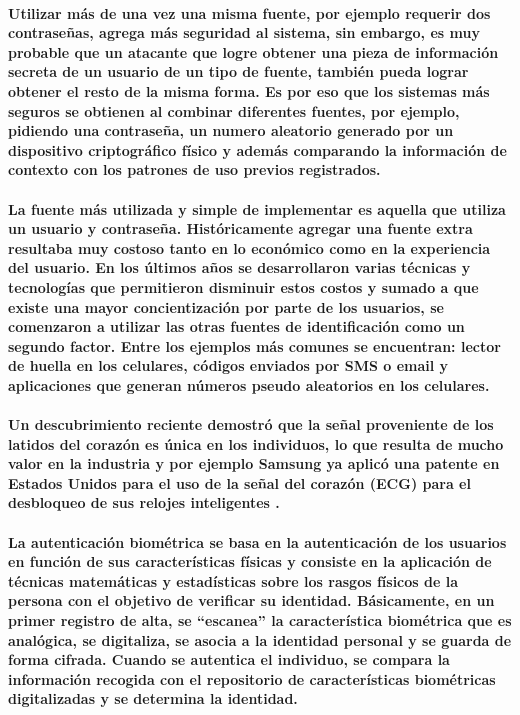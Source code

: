 \documentclass{article}
\begin{document}
\paragraph{
Utilizar más de una vez una misma fuente, por ejemplo requerir dos contraseñas, agrega más seguridad al sistema, sin embargo, es muy probable que un atacante que logre obtener una pieza de información secreta de un usuario de un tipo de fuente, también pueda lograr obtener el resto de la misma forma. Es por eso que los sistemas más seguros se obtienen al combinar diferentes fuentes, por ejemplo, pidiendo una contraseña, un numero aleatorio generado por un dispositivo criptográfico físico y además comparando la información de contexto con los patrones de uso previos registrados.
}
\paragraph{
La fuente más utilizada y simple de implementar es aquella que utiliza un usuario y contraseña. Históricamente agregar una fuente extra resultaba muy costoso tanto en lo económico como en la experiencia del usuario. En los últimos años se desarrollaron varias técnicas y tecnologías que permitieron disminuir estos costos y sumado a que existe una mayor concientización por parte de los usuarios, se comenzaron a utilizar las otras fuentes de identificación como un segundo factor. Entre los ejemplos más comunes se encuentran: lector de huella en los celulares, códigos enviados por SMS o email y aplicaciones que generan números pseudo aleatorios en los celulares.
}
\paragraph{
Un descubrimiento reciente demostró que la señal proveniente de los latidos del corazón es única en los individuos, lo que resulta de mucho valor en la industria y por ejemplo Samsung ya aplicó una patente en Estados Unidos para el uso de la señal del corazón (ECG) para el desbloqueo de sus relojes inteligentes \cite{samsung2016}.
}
\paragraph{
La autenticación biométrica se basa en la autenticación de los usuarios en función de sus características físicas y consiste en la aplicación de técnicas matemáticas y estadísticas sobre los rasgos físicos de la persona con el objetivo de verificar su identidad. Básicamente, en un primer registro de alta, se “escanea” la característica biométrica que es analógica, se digitaliza, se asocia a la identidad personal y se guarda de forma cifrada. Cuando se autentica el individuo, se compara la información recogida con el repositorio de características biométricas digitalizadas y se determina la identidad. \cite{esparza2017}
}
\end{document}
